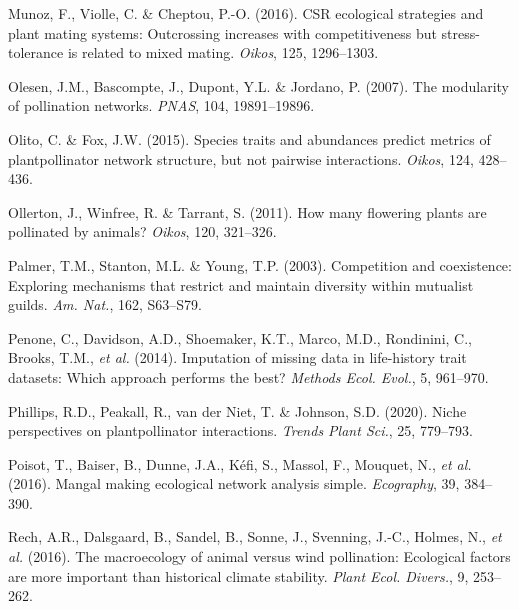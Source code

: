 \documentclass[
  12pt,
  a4paper,
]{article}
\newlength{\cslhangindent}
\newlength{\cslentryspacingunit} %
\newenvironment{CSLReferences}[2] %
 {%
  \setlength{\parindent}{0pt}
  \ifodd #1
  \let\oldpar\par
  \def\par{\hangindent=\cslhangindent\oldpar}
  \fi
  \setlength{\parskip}{#2\cslentryspacingunit}
 }%
 {}
\begin{document}
\begin{CSLReferences}{1}{0}
\leavevmode{}%
Munoz, F., Violle, C. \& Cheptou, P.-O. (2016). {CSR} ecological strategies and plant mating systems: Outcrossing increases with competitiveness but stress-tolerance is related to mixed mating. \emph{Oikos}, 125, 1296--1303.

\leavevmode{}%
Olesen, J.M., Bascompte, J., Dupont, Y.L. \& Jordano, P. (2007). The modularity of pollination networks. \emph{PNAS}, 104, 19891--19896.

\leavevmode{}%
Olito, C. \& Fox, J.W. (2015). Species traits and abundances predict metrics of plant\textendash pollinator network structure, but not pairwise interactions. \emph{Oikos}, 124, 428--436.

\leavevmode{}%
Ollerton, J., Winfree, R. \& Tarrant, S. (2011). How many flowering plants are pollinated by animals? \emph{Oikos}, 120, 321--326.

\leavevmode{}%
Palmer, T.M., Stanton, M.L. \& Young, T.P. (2003). Competition and coexistence: Exploring mechanisms that restrict and maintain diversity within mutualist guilds. \emph{Am. Nat.}, 162, S63--S79.

\leavevmode{}%
Penone, C., Davidson, A.D., Shoemaker, K.T., Marco, M.D., Rondinini, C., Brooks, T.M., \emph{et al.} (2014). Imputation of missing data in life-history trait datasets: Which approach performs the best? \emph{Methods Ecol. Evol.}, 5, 961--970.

\leavevmode{}%
Phillips, R.D., Peakall, R., van der Niet, T. \& Johnson, S.D. (2020). Niche perspectives on plant\textendash pollinator interactions. \emph{Trends Plant Sci.}, 25, 779--793.

\leavevmode{}%
Poisot, T., Baiser, B., Dunne, J.A., Kéfi, S., Massol, F., Mouquet, N., \emph{et al.} (2016). Mangal \textendash{} making ecological network analysis simple. \emph{Ecography}, 39, 384--390.

\leavevmode{}%
Rech, A.R., Dalsgaard, B., Sandel, B., Sonne, J., Svenning, J.-C., Holmes, N., \emph{et al.} (2016). The macroecology of animal versus wind pollination: Ecological factors are more important than historical climate stability. \emph{Plant Ecol. Divers.}, 9, 253--262.


\end{CSLReferences}
\end{document}
